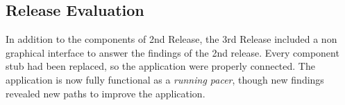\subsection{Release Evaluation}
In addition to the components of 2nd Release, the 3rd Release included a non graphical interface to answer the findings of the 2nd release. Every component stub had been replaced, so the application were properly connected. The application is now fully functional as a \textit{running pacer}, though new findings revealed new paths to improve the application.
